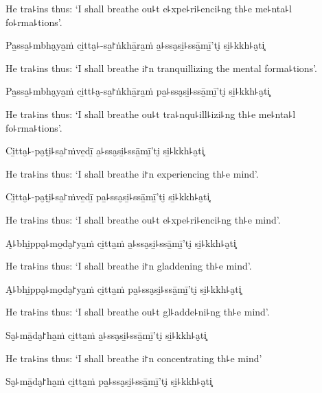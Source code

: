 \begin{english}
  He tra꜕ins thus: `I shall breathe ou꜕t e꜕xpe꜕ri꜕enci꜕ng th꜕e me꜕nta꜕l fo꜕rma꜕tions'.
\end{english}

Pa̱ssa̱꜕mbha̮ya̱ṁ ci̱tta̮꜕-sa̱꜓ṅkhā̱ra̱ṁ a̱꜕ssa̮si̱꜕ssā̱mī̱'ti̮ si̱꜕kkh꜕a̮ti͓

\begin{english}
  He tra꜕ins thus: `I shall breathe i꜓n tranquillizing the mental forma꜕tions'.
\end{english}

Pa̱ssa̱꜕mbha̮ya̱ṁ ci̱tt꜕a̮-sa̱꜓ṅkhā̱ra̱ṁ pa̱꜕ssa̮si̱꜕ssā̱mī̱'ti̮ si̱꜕kkh꜕a̮ti͓

\begin{english}
  He tra꜕ins thus: `I shall breathe ou꜕t tra꜕nqu꜕ill꜕izi꜕ng th꜕e me꜕nta꜕l fo꜕rma꜕tions'.
\end{english}

Ci̱tta̮꜕-pa̮ṭi̮꜕sa̱꜓ṁve̱dī̱ a̱꜕ssa̮si̱꜕ssā̱mī̱'ti̮ si̱꜕kkh꜕a̮ti͓

\begin{english}
  He tra꜕ins thus: `I shall breathe i꜓n experiencing th꜕e mind'.
\end{english}

Ci̱tta̮꜕-pa̮ṭi̮꜕sa̱꜓ṁve̱dī̱ pa̱꜕ssa̮si̱꜕ssā̱mī̱'ti̮ si̱꜕kkh꜕a̮ti͓

\begin{english}
  He tra꜕ins thus: `I shall breathe ou꜕t e꜕xpe꜕ri꜕enci꜕ng th꜕e mind'.
\end{english}

A̮꜕bhi̱ppa̮꜕mo̱da̮꜓ya̱ṁ ci̱tta̱ṁ a̱꜕ssa̮si̱꜕ssā̱mī̱'ti̮ si̱꜕kkh꜕a̮ti͓

\begin{english}
  He tra꜕ins thus: `I shall breathe i꜓n gladdening th꜕e mind'.
\end{english}

A̮꜕bhi̱ppa̮꜕mo̱da̮꜓ya̱ṁ ci̱tta̱ṁ pa̱꜕ssa̮si̱꜕ssā̱mī̱'ti̮ si̱꜕kkh꜕a̮ti͓

\begin{english}
  He tra꜕ins thus: `I shall breathe ou꜕t gl꜕adde꜕ni꜕ng th꜕e mind'.
\end{english}

Sa̮꜕mā̱da̮꜓ha̱ṁ ci̱tta̱ṁ a̱꜕ssa̮si̱꜕ssā̱mī̱'ti̮ si̱꜕kkh꜕a̮ti͓

\begin{english}
  He tra꜕ins thus: `I shall breathe i꜓n concentrating th꜕e mind'
\end{english}

Sa̮꜕mā̱da̮꜓ha̱ṁ ci̱tta̱ṁ pa̱꜕ssa̮si̱꜕ssā̱mī̱'ti̮ si̱꜕kkh꜕a̮ti͓


